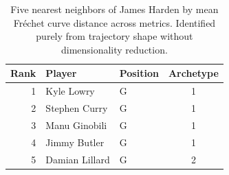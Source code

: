 \begin{table}[htbp]
  \centering\small
  \begin{tabular}{rllc}
    \toprule
    Rank & Player & Position & Archetype \\
    \midrule
    1 & Kyle Lowry & G & 1 \\
    2 & Stephen Curry & G & 1 \\
    3 & Manu Ginobili & G & 1 \\
    4 & Jimmy Butler & G & 1 \\
    5 & Damian Lillard & G & 2 \\
    \bottomrule
  \end{tabular}
  \caption{Five nearest neighbors of James Harden by mean Fr\'{e}chet curve distance across metrics. Identified purely from trajectory shape without dimensionality reduction.}
  \label{tab:James_Harden_frechet_curve_neighbors}
\end{table}

